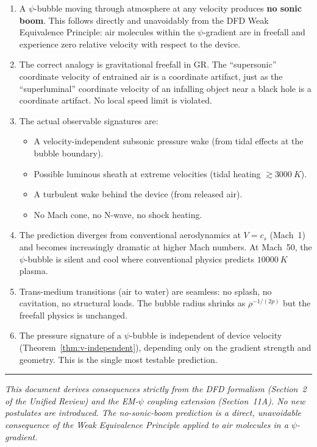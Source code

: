 \documentclass[12pt, letterpaper]{article}
\theoremstyle{definition}
\theoremstyle{remark}
\newcommand{\cs}{c_s}
\begin{document}
\begin{enumerate}
\item A $\psi$-bubble moving through atmosphere at any velocity produces
\textbf{no sonic boom}. This follows directly and unavoidably from the DFD
Weak Equivalence Principle: air molecules within the $\psi$-gradient are in
freefall and experience zero relative velocity with respect to the device.

\item The correct analogy is gravitational freefall in GR. The ``supersonic''
coordinate velocity of entrained air is a coordinate artifact, just as the
``superluminal'' coordinate velocity of an infalling object near a black hole
is a coordinate artifact. No local speed limit is violated.

\item The actual observable signatures are:
\begin{itemize}
\item A velocity-independent subsonic pressure wake (from tidal effects at the
bubble boundary).
\item Possible luminous sheath at extreme velocities (tidal heating $\gtrsim \SI{3000}{K}$).
\item A turbulent wake behind the device (from released air).
\item No Mach cone, no N-wave, no shock heating.
\end{itemize}

\item The prediction diverges from conventional aerodynamics at $V = \cs$
(Mach~1) and becomes increasingly dramatic at higher Mach numbers. At Mach~50,
the $\psi$-bubble is silent and cool where conventional physics predicts
$\SI{10000}{K}$ plasma.

\item Trans-medium transitions (air to water) are seamless: no splash, no
cavitation, no structural loads. The bubble radius shrinks as $\rho^{-1/(2p)}$
but the freefall physics is unchanged.

\item The pressure signature of a $\psi$-bubble is independent of device
velocity (Theorem~\ref{thm:v-independent}), depending only on the gradient
strength and geometry. This is the single most testable prediction.
\end{enumerate}

\vspace{1em}
\noindent\rule{\textwidth}{0.4pt}
\textit{This document derives consequences strictly from the DFD formalism
(Section~2 of the Unified Review) and the EM-$\psi$ coupling extension
(Section~11A). No new postulates are introduced. The no-sonic-boom prediction
is a direct, unavoidable consequence of the Weak Equivalence Principle applied
to air molecules in a $\psi$-gradient.}
\end{document}
